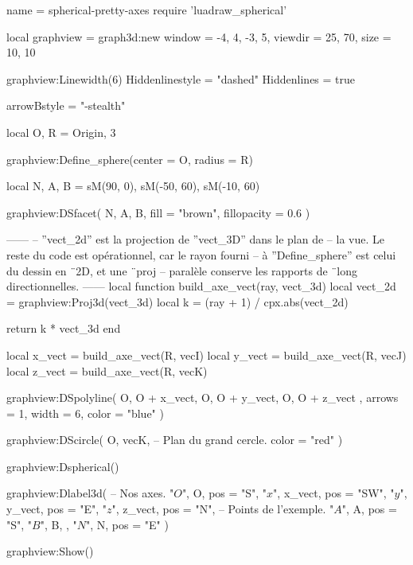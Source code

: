 \documentclass{standalone}
\begin{document}
\begin{luadraw}{name = spherical-pretty-axes}
require 'luadraw_spherical'

local graphview = graph3d:new{
  window  = {-4, 4, -3, 5},
  viewdir = {25, 70},
  size    = {10, 10}
}

graphview:Linewidth(6)
Hiddenlinestyle = "dashed"
Hiddenlines     = true

arrowBstyle = "-stealth"

local O, R = Origin, 3

graphview:Define_sphere({center = O, radius = R})

local N, A, B = sM(90, 0), sM(-50, 60), sM(-10, 60)

graphview:DSfacet(
  {N, A, B},
  {fill = "brown", fillopacity = 0.6}
)

------
-- ''vect_2d'' est la projection de ''vect_3D'' dans le plan de
-- la vue. Le reste du code est opérationnel, car le rayon fourni
-- à ''Define_sphere'' est celui du dessin en ¨2D, et une ¨proj
-- paralèle conserve les rapports de ¨long directionnelles.
------
local function build_axe_vect(ray, vect_3d)
  local vect_2d = graphview:Proj3d(vect_3d)
  local k       = (ray + 1) / cpx.abs(vect_2d)

  return k * vect_3d
end

local x_vect = build_axe_vect(R, vecI)
local y_vect = build_axe_vect(R, vecJ)
local z_vect = build_axe_vect(R, vecK)

graphview:DSpolyline(
  {
    {O, O + x_vect},
    {O, O + y_vect},
    {O, O + z_vect}
  },
  {arrows = 1, width = 6, color = "blue"}
)

graphview:DScircle(
  {O, vecK},       -- Plan du grand cercle.
  {color = "red"}
)

graphview:Dspherical()

graphview:Dlabel3d(
-- Nos axes.
  "$O$", O, {pos = "S"},
  "$x$", x_vect, {pos = "SW"},
  "$y$", y_vect, {pos = "E"},
  "$z$", z_vect, {pos = "N"},
-- Points de l'exemple.
  "$A$", A, {pos = "S"},
  "$B$", B, {},
  "$N$", N, {pos = "E"}
)

graphview:Show()
\end{luadraw}
\end{document}
